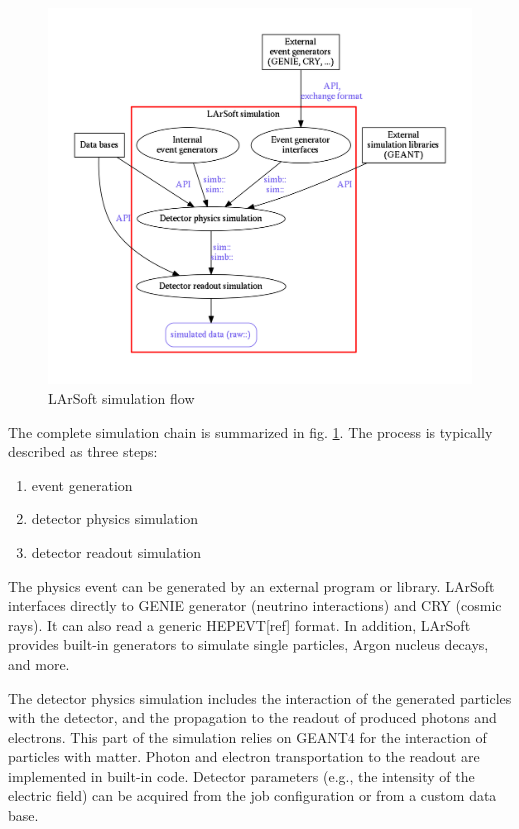 \documentclass{article}
\begin{document}
\begin{figure}[htbp]
\centering
\includegraphics[width=\textwidth]{figures/LArSoftSimulationGraph.pdf}
\caption{\label{fig:LArSoftsimulation}LArSoft simulation flow}
\end{figure}

The complete simulation chain is summarized in fig.
\ref{fig:LArSoftsimulation}. The process is typically described as three
steps:

\begin{enumerate}
\def\labelenumi{\arabic{enumi}.}
\item
  event generation
\item
  detector physics simulation
\item
  detector readout simulation
\end{enumerate}

The physics event can be generated by an external program or library.
LArSoft interfaces directly to GENIE generator (neutrino interactions)
and CRY (cosmic rays). It can also read a generic HEPEVT{[}ref{]}
format. In addition, LArSoft provides built-in generators to simulate
single particles, Argon nucleus decays, and more.

The detector physics simulation includes the interaction of the
generated particles with the detector, and the propagation to the
readout of produced photons and electrons. This part of the simulation
relies on GEANT4 for the interaction of particles with matter. Photon
and electron transportation to the readout are implemented in built-in
code. Detector parameters (e.g., the intensity of the electric field)
can be acquired from the job configuration or from a custom data base.
\end{document}
